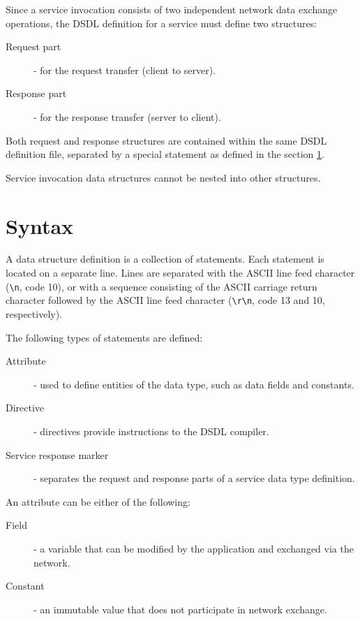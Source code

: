 Since a service invocation consists of two independent network data exchange operations,
the DSDL definition for a service must define two structures:

\begin{description}
    \item[Request part] - for the request transfer (client to server).
    \item[Response part] - for the response transfer (server to client).
\end{description}

Both request and response structures are contained within the same DSDL definition file,
separated by a special statement as defined in the section \ref{sec:dsdl_syntax}.

Service invocation data structures cannot be nested into other structures.

\section{Syntax}\label{sec:dsdl_syntax}

A data structure definition is a collection of statements.
Each statement is located on a separate line.
Lines are separated with the ASCII line feed character (\verb|\n|, code 10),
or with a sequence consisting of the ASCII carriage return character followed by the ASCII line feed character
(\verb|\r\n|, code 13 and 10, respectively).

The following types of statements are defined:

\begin{description}
    \item[Attribute] - used to define entities of the data type, such as data fields and constants.
    \item[Directive] - directives provide instructions to the DSDL compiler.
    \item[Service response marker] - separates the request and response parts of a service data type definition.
\end{description}

An attribute can be either of the following:

\begin{description}
    \item[Field] - a variable that can be modified by the application and exchanged via the network.
    \item[Constant] - an immutable value that does not participate in network exchange.
\end{description}

